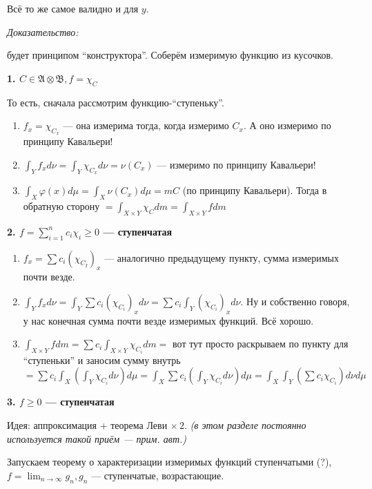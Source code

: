 \documentclass{article}
\begin{document}
Всё то же самое валидно и для $y$.

\textit{Доказательство:}

будет принципом ``конструктора''. Соберём измеримую функцию из кусочков.

\textbf{1. $C \in \mathfrak{A} \otimes \mathfrak{B}, f = \chi_C$}

То есть, сначала рассмотрим функцию-``ступеньку''. 

\begin{enumerate}
    \item $f_x = \chi_{C_x}$ --- она измерима тогда, когда измеримо $C_x$. А оно измеримо по принципу Кавальери!
    \item $\int_{Y} f_x d\nu = \int_{Y} \chi_{C_x} d\nu = \nu(C_x)$ --- измеримо по принципу Кавальери!
    \item $\int_{X} \varphi(x) d\mu = \int_{X} \nu(C_x) d\mu = mC$ (по принципу Кавальери). Тогда в обратную сторону $= \int_{X \times Y} \chi_{C} dm = \int_{X \times Y} f dm$
\end{enumerate}

\textbf{2. $f = \sum_{i = 1}^{n} c_i \chi_i \ge 0$ --- ступенчатая}

\begin{enumerate}
    \item $f_x = \sum c_i (\chi_{C_I})_x$ --- аналогично предыдущему пункту, сумма измеримых почти везде.
    \item $\int_{Y} f_x d\nu = \int_{Y} \sum c_i (\chi_{C_i})_x d\nu = \sum c_i \int_{Y} (\chi_{C_i})_x d\nu$. Ну и собственно говоря, у нас конечная сумма почти везде измеримых функций. Всё хорошо.
    \item $\int_{X \times Y} f dm = \sum c_i \int_{X \times Y} \chi_{C_i} dm=$ вот тут просто раскрываем по пункту для ``ступеньки'' и заносим сумму внутрь $=\sum c_i \int_{X} \left(\int_{Y} \chi_{C_i} d\nu\right) d\mu = \int_{X} \sum c_i \left( \int_{Y} \chi_{C_i} d\nu \right) d\mu = \int_{X} \int_{Y} \left( \sum c_i \chi_{C_i}\right) d\nu d\mu$
\end{enumerate}

\textbf{3. $f \ge 0$ --- ступенчатая}

Идея: аппроксимация + теорема Леви $\times \, 2$. \textit{(в этом разделе постоянно используется такой приём --- прим. авт.)}

Запускаем теорему о характеризации измеримых функций ступенчатыми (?), $f = \lim_{n \rightarrow \infty} g_n, g_n$ --- ступенчатые, возрастающие.
\end{document}
